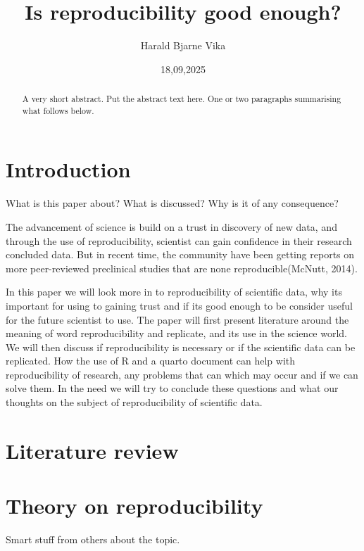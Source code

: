 \documentclass[
  british,
  a4paper,
]{article}
\title{Is reproducibility good enough?}
\author{Harald Bjarne Vika}
\date{18,09,2025}
\begin{document}
\maketitle
\begin{abstract}
A very short abstract. Put the abstract text here. One or two paragraphs
summarising what follows below.
\end{abstract}


\section{Introduction}\label{introduction}

What is this paper about? What is discussed? Why is it of any
consequence?

The advancement of science is build on a trust in discovery of new data,
and through the use of reproducibility, scientist can gain confidence in
their research concluded data. But in recent time, the community have
been getting reports on more peer-reviewed preclinical studies that are
none reproducible(McNutt, 2014).

In this paper we will look more in to reproducibility of scientific
data, why its important for using to gaining trust and if its good
enough to be consider useful for the future scientist to use. The paper
will first present literature around the meaning of word reproducibility
and replicate, and its use in the science world. We will then discuss if
reproducibility is necessary or if the scientific data can be
replicated. How the use of R and a quarto document can help with
reproducibility of research, any problems that can which may occur and
if we can solve them. In the need we will try to conclude these
questions and what our thoughts on the subject of reproducibility of
scientific data.

\section{Literature review}\label{literature-review}

\section{Theory on reproducibility}\label{theory-on-reproducibility}

Smart stuff from others about the topic.
\end{document}

